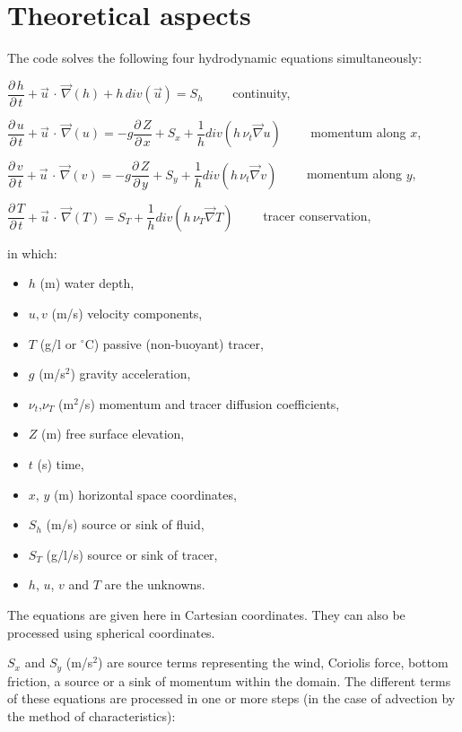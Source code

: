 \chapter{Theoretical aspects}
\label{ch:theo:asp}
The  code solves the following four hydrodynamic equations
simultaneously:


$\dfrac{\partial \, h}{\partial \, t} +\vec{u}\, \cdot \, \vec{\nabla }(h)+h\, div(\vec{u})=S_{h} \qquad$    continuity,


$\dfrac{\partial \, u}{\partial \, t} +\vec{u}\, \cdot \, \vec{\nabla }(u)=-g\dfrac{\partial \, Z}{\partial \, x} +S_{x} +\dfrac{1}{h} div(h\, \nu _{t} \vec{\nabla }u)\qquad$  momentum along $x$,


$\dfrac{\partial \, v}{\partial \, t} +\vec{u}\, \cdot \, \vec{\nabla }(v)=-g\dfrac{\partial \, Z}{\partial \, y} +S_{y} +\dfrac{1}{h} div(h\, \nu _{t} \vec{\nabla }v)\qquad$  momentum along $y$,


$\dfrac{\partial \, T}{\partial \, t} +\vec{u}\, \cdot \, \vec{\nabla }(T)=S_{T} +\dfrac{1}{h} div(h\, \nu _{T} \vec{\nabla }T)\qquad$   tracer conservation,

 
in which:

\begin{itemize}
\item $h$ (m)  water depth,
\item $u,v$ (m/s)  velocity components,
\item $T$ (g/l or $^\circ$C) passive (non-buoyant) tracer,
\item $g$ (m/s$^2$)  gravity acceleration,
\item $\nu_t$,$\nu_T$ (m$^2$/s)  momentum and tracer diffusion coefficients,
\item $Z$ (m)  free surface elevation,
\item $t$ (s)  time,
\item $x$, $y$ (m)  horizontal space coordinates,
\item $S_h$ (m/s)  source or sink of fluid,
\item $S_T$ (g/l/s)  source or sink of tracer,
\item $h$, $u$, $v$ and $T$ are the unknowns.
\end{itemize}

The equations are given here in Cartesian coordinates.
They can also be processed using spherical coordinates.

$S_x$ and $S_y$ (m/s$^2$) are source terms representing the wind, Coriolis force,
bottom friction, a source or a sink of momentum within the domain.
The different terms of these equations are processed in one or more steps
(in the case of advection by the method of characteristics):

